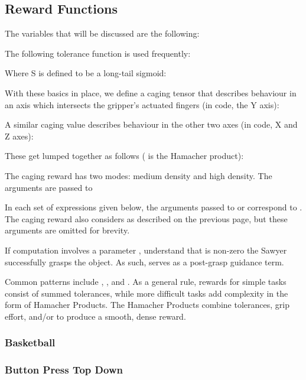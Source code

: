 {\setlength{\mathindent}{0cm}\subsection{Reward Functions}
The variables that will be discussed are the following:

The following tolerance function is used frequently:



Where  S is defined to be a long-tail sigmoid:



With these basics in place, we define a caging tensor that describes behaviour in an axis which intersects the gripper's actuated fingers (in code, the Y axis):



A similar caging value describes behaviour in the other two axes (in code, X and Z axes):



These get lumped together as follows ( is the Hamacher product):




The caging reward has two modes: medium density and high density. The arguments  are passed to 





In each set of expressions given below, the arguments passed to  or  correspond to . The caging reward also considers  as described on the previous page, but these arguments are omitted for brevity.

If computation involves a parameter , understand that  is non-zero  the Sawyer successfully grasps the object. As such,  serves as a post-grasp guidance term.

Common patterns include , , and . As a general rule, rewards for simple tasks consist of summed tolerances, while more difficult tasks add complexity in the form of Hamacher Products. The Hamacher Products combine tolerances, grip effort, and/or  to produce a smooth, dense reward.

\pagebreak


\subsubsection{Basketball}



\subsubsection{Button Press Top Down}


}
